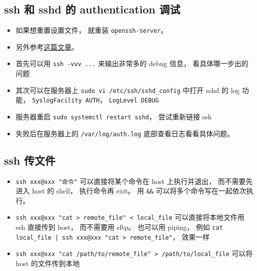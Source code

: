 \subsection{ssh 和 sshd 的 authentication 调试}
\begin{itemize}
\item 如果想重置设置文件， 就重装 \verb`openssh-server`。
\item 另外参考\href{https://medium.com/ci-cd-devops/ssh-receive-packet-type-51-154288e46609}{这篇文章}。
\item 首先可以用 \verb`ssh -vvv ...` 来输出非常多的 debug 信息， 看具体哪一步出的问题
\item 其次可以在服务器上 \verb`sudo vi /etc/ssh/sshd_config` 中打开 sshd 的 log 功能， \verb`SyslogFacility AUTH`， \verb`LogLevel DEBUG`
\item 服务器重启 \verb`sudo systemctl restart sshd`， 尝试重新链接 ssh
\item 失败后在服务器上的 \verb`/var/log/auth.log` 底部查看日志看看具体问题。
\end{itemize}

\subsection{ssh 传文件}
\begin{itemize}
\item \verb`ssh xxx@xxx "命令"` 可以直接将某个命令在 host 上执行并退出， 而不需要先进入 host 的 shell， 执行命令再 exit。 用 \verb`&&` 可以将多个命令写在一起依次执行。
\item \verb`ssh xxx@xxx "cat > remote_file" < local_file` 可以直接将本地文件用 ssh 直接传到 host， 而不需要用 sftp。 也可以用 piping， 例如 \verb`cat local_file | ssh xxx@xxx "cat > remote_file"`， 效果一样
\item \verb`ssh xxx@xxx "cat /path/to/remote_file" > /path/to/local_file` 可以将 host 的文件传到本地
\end{itemize}

